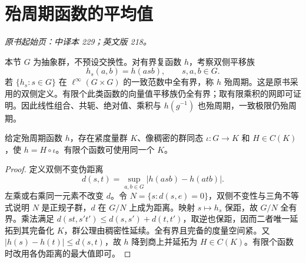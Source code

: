 \section{殆周期函数的平均值}\label{sec:yosida-08-05}
\noindent\textit{原书起始页：中译本 229；英文版 218。}

本节 $G$ 为抽象群，不预设交换性。对有界复函数 $h$，考察双侧平移族
\[
 h_s(a,b)=h(asb),\qquad s,a,b\in G.
\]
若 $\{h_s:s\in G\}$ 在 $\ell^\infty(G\times G)$ 的一致范数中全有界，称 $h$ 殆周期。这是原书采用的双侧定义。有限个此类函数的向量值平移族仍全有界；取有限乘积的网即可证明。因此线性组合、共轭、绝对值、乘积与 $h(g^{-1})$ 也殆周期，一致极限仍殆周期。

\begin{lemma}[从函数得到紧度量群]\label{lem:y8-compact-group}
给定殆周期函数 $h$，存在紧度量群 $K$、像稠密的群同态 $\iota:G\to K$ 和 $H\in C(K)$，使 $h=H\circ\iota$。有限个函数可使用同一个 $K$。
\end{lemma}
\begin{proof}
定义双侧不变伪距离
\[
 d(s,t)=\sup_{a,b\in G}|h(asb)-h(atb)|.
\]
左乘或右乘同一元素不改变 $d$。令 $N=\{s:d(s,e)=0\}$，双侧不变性与三角不等式说明 $N$ 是正规子群，$d$ 在 $G/N$ 上成为距离。映射 $s\mapsto h_s$ 保距，故 $G/N$ 全有界。乘法满足
$d(st,s't')\le d(s,s')+d(t,t')$，取逆也保距，因而二者唯一延拓到其完备化 $K$，群公理由稠密性延续。全有界且完备的度量空间紧。又 $|h(s)-h(t)|\le d(s,t)$，故 $h$ 降到商上并延拓为 $H\in C(K)$。有限个函数时改用各伪距离的最大值即可。
\end{proof}

